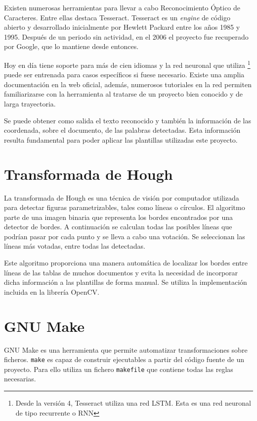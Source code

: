 Existen numerosas herramientas para llevar a cabo Reconocimiento Óptico de Caracteres. Entre ellas destaca Tesseract. Tesseract es un \emph{engine} de código abierto y desarrollado inicialmente por Hewlett Packard entre los años 1985 y 1995. Después de un periodo sin actividad, en el 2006 el proyecto fue recuperado por Google, que lo mantiene desde entonces.

Hoy en día tiene soporte para más de cien idiomas y la red neuronal que utiliza \footnote{Desde la versión 4, Tesseract utiliza una red LSTM. Esta es una red neuronal de tipo recurrente o RNN} puede ser entrenada para casos específicos si fuese necesario. Existe una amplia documentación en la web oficial, además, numerosos tutoriales en la red permiten familiarizarse con la herramienta al tratarse de un proyecto bien conocido y de larga trayectoria.

Se puede obtener como salida el texto reconocido y también la información de las coordenada, sobre el documento, de las palabras detectadas. Esta información resulta fundamental para poder aplicar las plantillas utilizadas este proyecto.

\section{Transformada de Hough}

La transformada de Hough es una técnica de visión por computador utilizada para detectar figuras parametrizables, tales como líneas o círculos. El algoritmo parte de una imagen binaria que representa los bordes encontrados por una detector de bordes. A continuación se calculan todas las posibles líneas que podrían pasar por cada punto y se lleva a cabo una votación. Se seleccionan las líneas más votadas, entre todas las detectadas.

Este algoritmo proporciona una manera automática de localizar los bordes entre líneas de las tablas de muchos documentos y evita la necesidad de incorporar dicha información a las plantillas de forma manual. Se utiliza la implementación incluida en la librería OpenCV.

\section{GNU Make}

GNU Make es una herramienta que permite automatizar transformaciones sobre ficheros. \verb|make| es capaz de construir ejecutables a partir del código fuente de un proyecto. Para ello utiliza un fichero \verb|makefile| que contiene todas las reglas necesarias.


